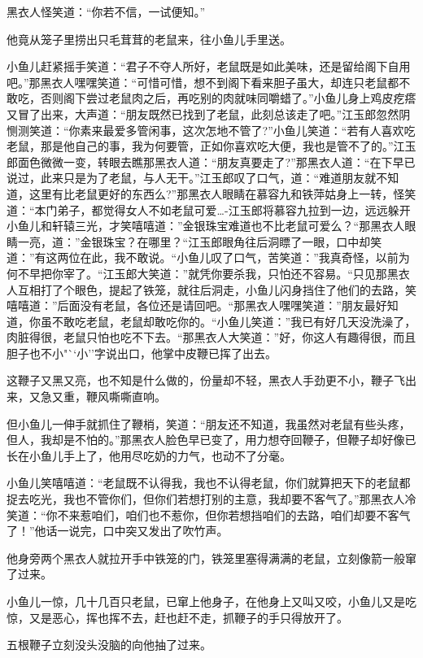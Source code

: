 \documentclass[12pt,oneside]{book}
\begin{document}
黑衣人怪笑道：``你若不信，一试便知。''

他竟从笼子里捞出只毛茸茸的老鼠来，往小鱼儿手里送。

小鱼儿赶紧摇手笑道：``君子不夺人所好，老鼠既是如此美味，还是留给阁下自用吧。''那黑衣人嘿嘿笑道：``可惜可惜，想不到阁下看来胆子虽大，却连只老鼠都不敢吃，否则阁下尝过老鼠肉之后，再吃别的肉就味同嚼蜡了。''小鱼儿身上鸡皮疙瘩又冒了出来，大声道：``朋友既然已找到了老鼠，此刻总该走了吧。''江玉郎忽然阴恻测笑道：``你素来最爱多管闲事，这次怎地不管了?''小鱼儿笑道：``若有人喜欢吃老鼠，那是他自己的事，我为何要管，正如你喜欢吃大便，我也是管不了的。''江玉郎面色微微一变，转眼去瞧那黑衣人道：``朋友真要走了?''那黑衣人道：``在下早已说过，此来只是为了老鼠，与人无干。''江玉郎叹了口气，道：``难道朋友就不知道，这里有比老鼠更好的东西么?''那黑衣人眼睛在慕容九和铁萍姑身上一转，怪笑道：``本门弟子，都觉得女人不如老鼠可爱\ldots-江玉郎将慕容九拉到一边，远远躲开小鱼儿和轩辕三光，才笑嘻嘻道：''金银珠宝难道也不比老鼠可爱么？``那黑衣人眼睛一亮，道：''金银珠宝？在哪里？``江玉郎眼角往后洞瞟了一眼，口中却笑道：''有这两位在此，我不敢说。``小鱼儿叹了口气，苦笑道：''我真奇怪，以前为何不早把你宰了。``江玉郎大笑道：''就凭你要杀我，只怕还不容易。``只见那黑衣人互相打了个眼色，提起了铁笼，就往后洞走，小鱼儿闪身挡住了他们的去路，笑嘻嘻道：''后面没有老鼠，各位还是请回吧。``那黑衣人嘿嘿笑道：''朋友最好知道，你虽不敢吃老鼠，老鼠却敢吃你的。``小鱼儿笑道：''我已有好几天没洗澡了，肉脏得很，老鼠只怕也吃不下去。``那黑衣人大笑道：''好，你这人有趣得很，而且胆子也不小"``小''字说出口，他掌中皮鞭已挥了出去。

这鞭子又黑又亮，也不知是什么做的，份量却不轻，黑衣人手劲更不小，鞭子飞出来，又急又重，鞭风嘶嘶直响。

但小鱼儿一伸手就抓住了鞭梢，笑道：``朋友还不知道，我虽然对老鼠有些头疼，但人，我却是不怕的。''那黑衣人脸色早已变了，用力想夺回鞭子，但鞭子却好像已长在小鱼儿手上了，他用尽吃奶的力气，也动不了分毫。

小鱼儿笑嘻嘻道：``老鼠既不认得我，我也不认得老鼠，你们就算把天下的老鼠都捉去吃光，我也不管你们，但你们若想打别的主意，我却要不客气了。''那黑衣人冷笑道：``你不来惹咱们，咱们也不惹你，但你若想挡咱们的去路，咱们却要不客气了！''他话一说完，口中突又发出了吹竹声。

他身旁两个黑衣人就拉开手中铁笼的门，铁笼里塞得满满的老鼠，立刻像箭一般窜了过来。

小鱼儿一惊，几十几百只老鼠，已窜上他身子，在他身上又叫又咬，小鱼儿又是吃惊，又是恶心，挥也挥不去，赶也赶不走，抓鞭子的手只得放开了。

五根鞭子立刻没头没脑的向他抽了过来。
\end{document}
